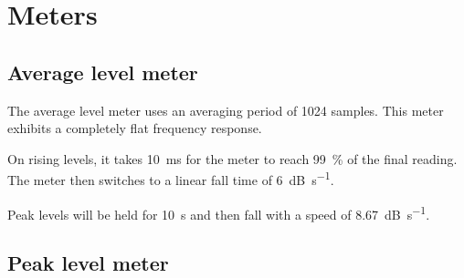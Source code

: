 




\chapter{Meters}
\label{chap:meters}

\section{Average level meter}

The average level meter uses an averaging period of \num{1024}
samples.  This meter exhibits a completely flat frequency response.

On rising levels, it takes \SI{10}{\milli\second} for the meter to
reach \SI{99}{\percent} of the final reading.  The meter then switches
to a linear fall time of \SI{6}{\dB\per\second}.

Peak levels will be held for \SI{10}{\second} and then fall with a
speed of \SI{8.67}{\dB\per\second}.

\section{Peak level meter}

